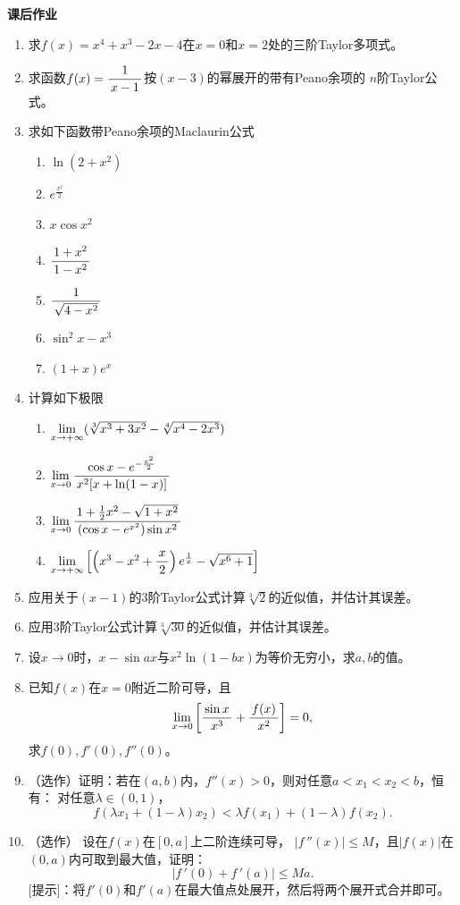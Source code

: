 \begin{ext}
	{\bf 课后作业}
	
	\begin{enumerate}
	  \item 求$f(x)=x^4+x^3-2x-4$在$x=0$和$x=2$处的三阶Taylor多项式。
	  \item 求函数$f(x)=\displaystyle\frac{\,{1}\,}{\,{x-1}\,}$按$(x-3)$的幂展开的带有Peano余项的
	  $n$阶Taylor公式。
	  \item 求如下函数带Peano余项的Maclaurin公式
		\begin{enumerate}[(1)]
		  \item $\ln(2+x^2)$
		  \item $e^{\frac{x^2}2}$
		  \item $x\cos x^2$
		  \item $\displaystyle\frac{\,{1+x^2}\,}{\,{1-x^2}\,}$
		  \item $\displaystyle\frac{\,{1}\,}{\,{\sqrt{4-x^2}}\,}$
		  \item $\sin^2x-x^3$
		  \item $(1+x)e^{x}$
		\end{enumerate}
	  \item 计算如下极限
	  \begin{enumerate}[(1)]
		\item $\lim\limits_{x\to{+\infty}}(\sqrt[3]{x^3+3x^2}-\sqrt[4]{x^4-2x^3})$
		\item $\lim\limits_{x\to{0}}\displaystyle\frac{\,{\cos x-e^{-\frac{x^2}2}}\,}{\,{x^2[x+\ln(1-x)]}\,}$
		\item $\lim\limits_{x\to{0}}\displaystyle\frac{\,{1+\frac12x^2-\sqrt{1+x^2}}\,}{\,{(\cos x-e^{x^2})\sin x^2}\,}$
		\item $\lim\limits_{x\to{+\infty}}\left[\left(x^3-x^2+\displaystyle\frac{\,{x}\,}{\,{2}\,}\right)e^{\frac1x}
		-\sqrt{x^6+1}\right]$
	  \end{enumerate}
	  \item 应用关于$(x-1)$的$3$阶Taylor公式计算$\sqrt[3]{2}$的近似值，并估计其误差。
	  \item 应用$3$阶Taylor公式计算$\sqrt[3]{30}$的近似值，并估计其误差。
	  \item 设$x\to 0$时，$x-\sin ax$与$x^2\ln(1-bx)$为等价无穷小，求$a,b$的值。
	  \item 已知$f(x)$在$x=0$附近二阶可导，且
	  $$\lim\limits_{x\to{0}}\left[\displaystyle\frac{\,{\sin x}\,}{\,{x^3}\,}+\displaystyle\frac{\,{f(x)}\,}{\,{x^2}\,}\right]=0,$$
	  求$f(0),f'(0),f''(0)$。
	  \item （选作）证明：若在$(a,b)$内，$f''(x)>0$，则对任意$a<x_1<x_2<b$，恒有：
	  对任意$\lambda\in(0,1)$，
		$$f(\lambda x_1+(1-\lambda)x_2)<\lambda
		f(x_1)+(1-\lambda)f(x_2).$$
	  \item （选作） 设在$f(x)$在$[0,a]$上二阶连续可导，
		$|f\,''(x)|\leq M$，且$|f(x)|$在$(0,a)$内可取到最大值，证明：
		$$|f\,'(0)+f\,'(a)|\leq Ma.$$		
		[提示]：将$f'(0)$和$f'(a)$在最大值点处展开，然后将两个展开式合并即可。
	\end{enumerate}
\end{ext}

